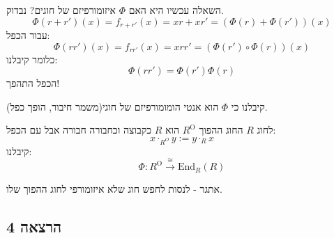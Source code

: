 \documentclass{tstextbook}
\begin{document}
השאלה עכשיו היא האם \(\Phi\) איזומורפיזם של חוגים?
נבדוק.
$$\Phi(r+r')(x)=f_{r+r'}(x)=xr+xr'=(\Phi(r)+\Phi(r'))(x)$$
עבור הכפל:
$$\Phi(rr')(x)=f_{rr'}(x)=xrr'=(\Phi(r')\circ  \Phi(r))(x)$$
כלומר קיבלנו:
$$\Phi(rr')=\Phi(r')\Phi(r)$$
הכפל התהפך!

קיבלנו כי \(\Phi\) הוא אנטי הומומורפיזם של חוגי(משמר חיבור, הופך כפל).

\begin{definition}
לחוג \(R\) החוג ההפוך \(R^{\text{O}}\) הוא \(R\) כקבוצה וכחבורה חבורה אבל עם הכפל:
$$x\cdot_{R^{O}}y := y\cdot_{R} x$$
קיבלנו:
$$\Phi:R^{\text{O}}\xrightarrow{\cong }\mathrm{End}_{R}(R)$$

\end{definition}
אתגר - לנסות לחפש חוג שלא איזומורפי לחוג ההפוך שלו.

\subsection{הרצאה 4}
\end{document}
